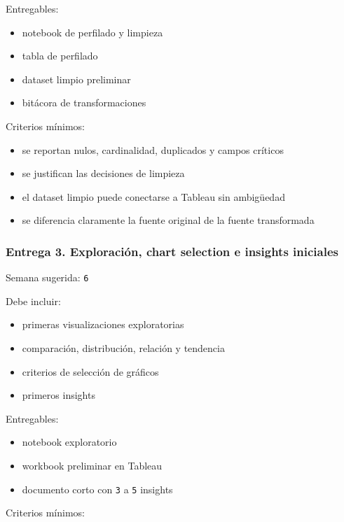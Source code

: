 \documentclass[
]{article}
\providecommand{\tightlist}{%
  \setlength{\itemsep}{0pt}\setlength{\parskip}{0pt}}
\begin{document}
Entregables:

\begin{itemize}
\tightlist
\item
  notebook de perfilado y limpieza
\item
  tabla de perfilado
\item
  dataset limpio preliminar
\item
  bitácora de transformaciones
\end{itemize}

Criterios mínimos:

\begin{itemize}
\tightlist
\item
  se reportan nulos, cardinalidad, duplicados y campos críticos
\item
  se justifican las decisiones de limpieza
\item
  el dataset limpio puede conectarse a Tableau sin ambigüedad
\item
  se diferencia claramente la fuente original de la fuente transformada
\end{itemize}

\subsubsection{Entrega 3. Exploración, chart selection e insights
iniciales}\label{entrega-3-exploraciuxf3n-chart-selection-e-insights-iniciales}

Semana sugerida: \texttt{6}

Debe incluir:

\begin{itemize}
\tightlist
\item
  primeras visualizaciones exploratorias
\item
  comparación, distribución, relación y tendencia
\item
  criterios de selección de gráficos
\item
  primeros insights
\end{itemize}

Entregables:

\begin{itemize}
\tightlist
\item
  notebook exploratorio
\item
  workbook preliminar en Tableau
\item
  documento corto con \texttt{3} a \texttt{5} insights
\end{itemize}

Criterios mínimos:
\end{document}
